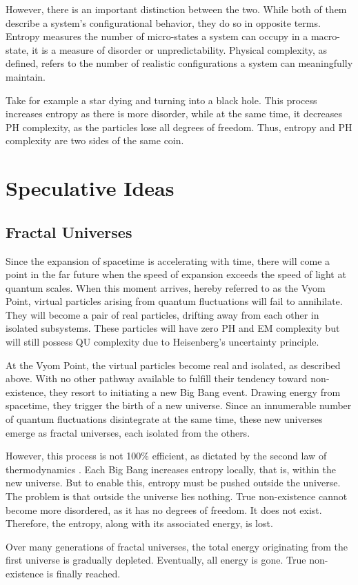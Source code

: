 \documentclass{article}
\begin{document}
However, there is an important distinction between the two. While both of them describe a system's configurational behavior, they do so in opposite terms. Entropy measures the number of micro-states a system can occupy in a macro-state, it is a measure of disorder or unpredictability. Physical complexity, as defined, refers to the number of realistic configurations a system can meaningfully maintain. 

Take for example a star dying and turning into a black hole. This process increases entropy as there is more disorder, while at the same time, it decreases PH complexity, as the particles lose all degrees of freedom. Thus, entropy and PH complexity are two sides of the same coin.



\newpage
\section{Speculative Ideas}


\subsection{Fractal Universes}

Since the expansion of spacetime is accelerating with time, there will come a point in the far future when the speed of expansion exceeds the speed of light at quantum scales. When this moment arrives, hereby referred to as the Vyom Point, virtual particles arising from quantum fluctuations will fail to annihilate. They will become a pair of real particles, drifting away from each other in isolated subsystems. These particles will have zero PH and EM complexity but will still possess QU complexity due to Heisenberg’s uncertainty principle.

At the Vyom Point, the virtual particles become real and isolated, as described above. With no other pathway available to fulfill their tendency toward non-existence, they resort to initiating a new Big Bang event. Drawing energy from spacetime, they trigger the birth of a new universe. Since an innumerable number of quantum fluctuations disintegrate at the same time, these new universes emerge as fractal universes, each isolated from the others.

However, this process is not 100\% efficient, as dictated by the second law of thermodynamics \cite{newton1687, clausius1865}. Each Big Bang increases entropy locally, that is, within the new universe. But to enable this, entropy must be pushed outside the universe. The problem is that outside the universe lies nothing. True non-existence cannot become more disordered, as it has no degrees of freedom. It does not exist. Therefore, the entropy, along with its associated energy, is lost.

Over many generations of fractal universes, the total energy originating from the first universe is gradually depleted. Eventually, all energy is gone. True non-existence is finally reached.



\newpage
\printbibliography
\end{document}
